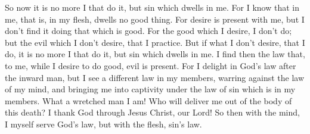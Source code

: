 {So now it is no more I that do it, but sin which dwells in me.
For I know that in me, that is, in my flesh, dwells no good thing. For desire is present with me, but I don’t find it doing that which is good.
For the good which I desire, I don’t do; but the evil which I don’t desire, that I practice.
But if what I don’t desire, that I do, it is no more I that do it, but sin which dwells in me.
I find then the law that, to me, while I desire to do good, evil is present.
For I delight in God’s law after the inward man,
but I see a different law in my members, warring against the law of my mind, and bringing me into captivity under the law of sin which is in my members.
What a wretched man I am! Who will deliver me out of the body of this death?
I thank God through Jesus Christ, our Lord! So then with the mind, I myself serve God’s law, but with the flesh, sin’s law.

}
